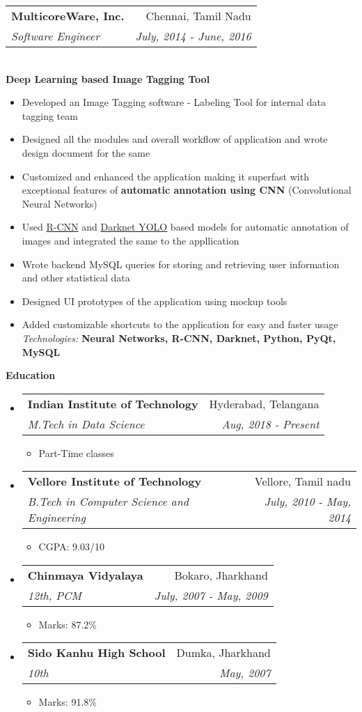 \documentclass[letterpaper,11pt]{article}
\makeatletter
\newcommand{\resitem}[1]{\item #1 \vspace{-2pt}}
\newcommand{\resheading}[1]{{\large \colorbox{mygrey}{\begin{minipage}{\textwidth}{\textbf{#1 \vphantom{p\^{E}}}}\end{minipage}}}}
\newcommand{\ressubheading}[4]{
\begin{tabular*}{7.0in}{l@{\extracolsep{\fill}}r}
		\textbf{#1} & #2 \\
		\textit{#3} & \textit{#4} \\
\end{tabular*}\vspace{-6pt}}
\makeatother
\begin{document}
\begin{itemize}
\begin{itemize}
	\end{itemize}
\pagebreak
	\vspace*{1px}
	\ressubheading{MulticoreWare, Inc.}{Chennai, Tamil Nadu}{Software Engineer}{July, 2014 - June, 2016}
	\vspace*{10px}
	\\\textbf{\quad Deep Learning based Image Tagging Tool}
	\begin{itemize}
		\vspace*{-5px}
		\resitem{Developed an Image Tagging software - Labeling Tool for internal data tagging team}
		\resitem{Designed all the modules and overall workflow of application and wrote design document for the same}
		\resitem{Customized and enhanced the application making it superfast with exceptional features of \textbf{automatic annotation using CNN} (Convolutional Neural Networks)}
		\resitem{Used \href{https://arxiv.org/abs/1506.01497}{R-CNN} and \href{https://pjreddie.com/darknet/yolo/}{Darknet YOLO} based models for automatic annotation of images and integrated the same to the appllication}
		\resitem{Wrote backend MySQL queries for storing and retrieving user information and other statistical data}
		\resitem{Designed UI prototypes of the application using mockup tools}
		\resitem{Added customizable shortcuts to the application for easy and faster usage}
		\vspace*{5px}
		\\\textit{Technologies:} \textbf{Neural Networks, R-CNN, Darknet, Python, PyQt, MySQL}
	\end{itemize}

\end{itemize}

\resheading{Education}
\begin{itemize}
\item
	\ressubheading{Indian Institute of Technology}{Hyderabad, Telangana}{M.Tech in Data Science}{Aug, 2018 - Present}
	\begin{itemize}
		\resitem{Part-Time classes}
	\end{itemize}
\item
	\ressubheading{Vellore Institute of Technology}{Vellore, Tamil nadu}{B.Tech in Computer Science and Engineering}{July, 2010 - May, 2014}
	\begin{itemize}
		\resitem{CGPA: 9.03/10}
	\end{itemize}
\item
	\ressubheading{Chinmaya Vidyalaya}{Bokaro, Jharkhand}{12th, PCM}{July, 2007 - May, 2009}
	\begin{itemize}
		\resitem{Marks: 87.2\%}
	\end{itemize}
\item
	\ressubheading{Sido Kanhu High School}{Dumka, Jharkhand}{10th}{May, 2007}
	\begin{itemize}
		\resitem{Marks: 91.8\%}
	\end{itemize}
\end{itemize}
\end{document}
